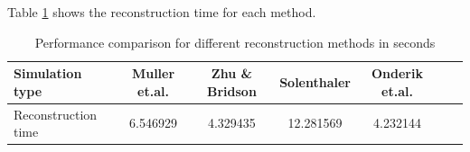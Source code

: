 Table \ref{tab:reconstruction_time} shows the reconstruction time for each method.
\begin{table}[h]
	\begin{center}
		\scriptsize
		\begin{tabular}{|l|c|c|c|c|c|c|}
			\hline
			Simulation type & Muller et.al. & Zhu \& Bridson & Solenthaler & Onderik et.al. \\
			\hline
			Reconstruction time		&	6.546929	&	4.329435	&	12.281569	&	4.232144	\\
			\hline
		\end{tabular}
	\end{center}
	\caption{Performance comparison for different reconstruction methods in seconds}
	\label{tab:reconstruction_time}
\end{table}

